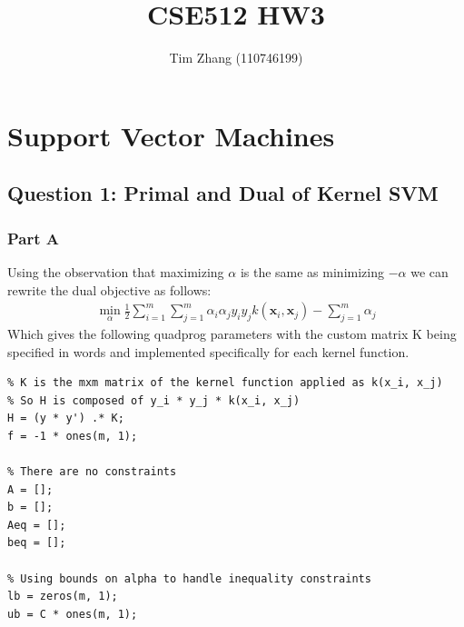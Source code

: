 \documentclass[11pt, oneside]{article}   	%
\title{CSE512 HW3}
\author{Tim Zhang (110746199)}
\date{}							%
\begin{document}
\maketitle

\DeclarePairedDelimiter{\norm}{\lVert}{\rVert}

\section{Support Vector Machines}
\subsection{Question 1: Primal and Dual of Kernel SVM}
\subsubsection{Part A}
Using the observation that maximizing $\alpha$ is the same as minimizing $-\alpha$ we can rewrite the dual objective as follows:
\begin{gather*}
\min_{\alpha} \frac{1}{2} \sum_{i = 1}^m\sum_{j = 1}^m \alpha_i \alpha_j y_i y_j k(\boldsymbol{x}_i , \boldsymbol{x}_j) - \sum_{j = 1}^m \alpha_j
\end{gather*}
Which gives the following quadprog parameters with the custom matrix K being specified in words and implemented specifically for each kernel function.
\begin{verbatim}
% K is the mxm matrix of the kernel function applied as k(x_i, x_j)
% So H is composed of y_i * y_j * k(x_i, x_j)
H = (y * y') .* K;
f = -1 * ones(m, 1);

% There are no constraints
A = [];
b = [];
Aeq = [];
beq = [];

% Using bounds on alpha to handle inequality constraints
lb = zeros(m, 1);
ub = C * ones(m, 1);
\end{verbatim}

\newpage{}
\end{document}
